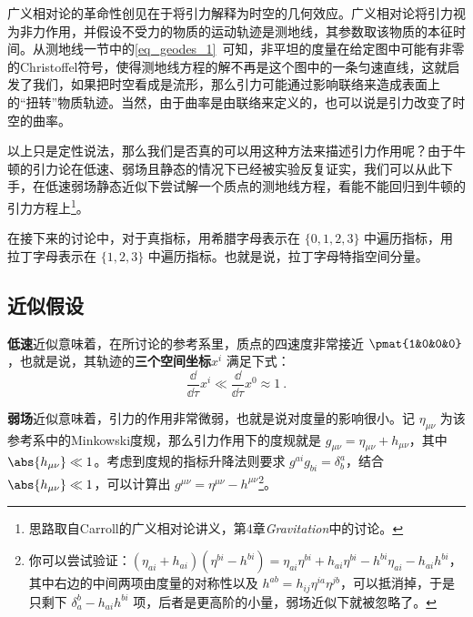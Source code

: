 

广义相对论的革命性创见在于将引力解释为时空的几何效应。广义相对论将引力视为非力作用，并假设不受力的物质的运动轨迹是测地线，其参数取该物质的本征时间。从测地线一节中的\autoref{eq_geodes_1}~可知，非平坦的度量在给定图中可能有非零的Christoffel符号，使得测地线方程的解不再是这个图中的一条匀速直线，这就启发了我们，如果把时空看成是流形，那么引力可能通过影响联络来造成表面上的“扭转”物质轨迹。当然，由于曲率是由联络来定义的，也可以说是引力改变了时空的曲率。

以上只是定性说法，那么我们是否真的可以用这种方法来描述引力作用呢？由于牛顿的引力论在低速、弱场且静态的情况下已经被实验反复证实，我们可以从此下手，在低速弱场静态近似下尝试解一个质点的测地线方程，看能不能回归到牛顿的引力方程上\footnote{思路取自Carroll的广义相对论讲义\cite{CarrollGR}，第4章\textsl{Gravitation}中的讨论。}。

在接下来的讨论中，对于真指标，用希腊字母表示在 $\{0, 1, 2, 3\}$ 中遍历指标，用拉丁字母表示在 $\{1, 2, 3\}$ 中遍历指标。也就是说，拉丁字母特指空间分量。

\subsection{近似假设}

\textbf{低速}近似意味着，在所讨论的参考系里，质点的四速度非常接近 $\pmat{1&0&0&0}$，也就是说，其轨迹的\textbf{三个空间坐标}$x^i$ 满足下式：
\begin{equation}\label{eq_WeakG_1}
\frac{\dd}{\dd \tau}x^i\ll \frac{\dd}{\dd \tau}x^0\approx 1~.
\end{equation}

\textbf{弱场}近似意味着，引力的作用非常微弱，也就是说对度量的影响很小。记 $\eta_{\mu\nu}$ 为该参考系中的Minkowski度规，那么引力作用下的度规就是 $g_{\mu\nu}=\eta_{\mu\nu}+h_{\mu\nu}$，其中 $\abs{h_{\mu\nu}}\ll 1$。考虑到度规的指标升降法则要求 $g^{ai}g_{bi}=\delta^a_b$，结合 $\abs{h_{\mu\nu}}\ll 1$，可以计算出 $g^{\mu\nu}=\eta^{\mu\nu}-h^{\mu\nu}$\footnote{你可以尝试验证：$(\eta_{ai}+h_{ai})(\eta^{bi}-h^{bi})=\eta_{ai}\eta^{bi}+h_{ai}\eta^{bi}-h^{bi}\eta_{ai}-h_{ai}h^{bi}$，其中右边的中间两项由度量的对称性以及 $h^{ab}=h_{ij}\eta^{ia}\eta^{jb}$，可以抵消掉，于是只剩下 $\delta^b_a-h_{ai}h^{bi}$ 项，后者是更高阶的小量，弱场近似下就被忽略了。}。

